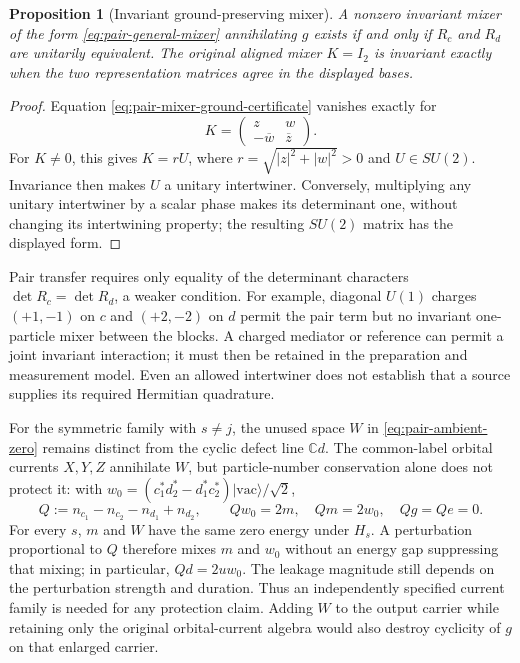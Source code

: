 \documentclass[11pt,reqno]{scrartcl}
\newcommand{\CC}{\mathbb C}
\newcommand{\ket}[1]{\lvert #1\rangle}
\theoremstyle{plain}
\newtheorem{proposition}[proposition]{Proposition}
\theoremstyle{definition}
\theoremstyle{remark}
\begin{document}
\begin{proposition}[Invariant ground-preserving mixer]
\label{prop:pair-invariant-mixer}
A nonzero invariant mixer of the form \eqref{eq:pair-general-mixer}
annihilating $g$ exists if and only if $R_c$ and $R_d$ are unitarily
equivalent.  The original aligned mixer $K=I_2$ is invariant exactly
when the two representation matrices agree in the displayed bases.
\end{proposition}
\begin{proof}
Equation \eqref{eq:pair-mixer-ground-certificate} vanishes exactly for
\begin{equation}
 K=\begin{pmatrix}z&w\\-\overline w&\overline z\end{pmatrix}.
\end{equation}
For $K\ne0$, this gives $K=rU$, where
$r=\sqrt{|z|^2+|w|^2}>0$ and $U\in SU(2)$.  Invariance then makes
$U$ a unitary intertwiner.  Conversely, multiplying any unitary
intertwiner by a scalar phase makes its determinant one, without
changing its intertwining property; the resulting $SU(2)$ matrix
has the displayed form.
\end{proof}

Pair transfer requires only equality of the determinant characters
$\det R_c=\det R_d$, a weaker condition.  For example, diagonal
$U(1)$ charges $(+1,-1)$ on $c$ and $(+2,-2)$ on $d$ permit the pair
term but no invariant one-particle mixer between the blocks.
A charged mediator or reference can permit a joint invariant
interaction; it must then be retained in the preparation and
measurement model.  Even an allowed intertwiner does not establish
that a source supplies its required Hermitian quadrature.

For the symmetric family with $s\ne j$, the unused space $W$ in
\eqref{eq:pair-ambient-zero} remains distinct from the cyclic defect
line $\CC d$.  The common-label orbital
currents $X,Y,Z$ annihilate $W$, but particle-number conservation
alone does not protect it: with
$w_0=(c_1^*d_2^*-d_1^*c_2^*)\ket{\mathrm{vac}}/\sqrt2$,
\begin{equation}
 Q:=n_{c_1}-n_{c_2}-n_{d_1}+n_{d_2},\qquad
 Qw_0=2m,\quad Qm=2w_0,\quad Qg=Qe=0.
\end{equation}
For every $s$, $m$ and $W$ have the same zero energy under $H_s$.
A perturbation proportional to $Q$ therefore mixes $m$ and $w_0$
without an energy gap suppressing that mixing; in particular,
$Qd=2u w_0$.  The leakage magnitude still depends on the perturbation
strength and duration.  Thus an independently specified current family is needed for any
protection claim.  Adding $W$ to the output carrier while retaining
only the original orbital-current algebra would also destroy
cyclicity of $g$ on that enlarged carrier.
\end{document}
